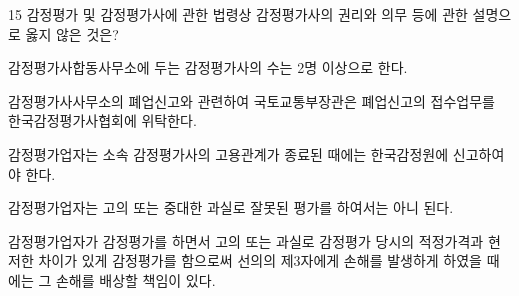\begin{question}{15}
감정평가 및 감정평가사에 관한 법령상 감정평가사의 권리와 의무 등에 관한 설명으로 옳지 않은 것은?
\begin{choices}
  \item 감정평가사합동사무소에 두는 감정평가사의 수는 2명 이상으로 한다.
  \item 감정평가사사무소의 폐업신고와 관련하여 국토교통부장관은 폐업신고의 접수업무를 한국감정평가사협회에 위탁한다.
  \item 감정평가업자는 소속 감정평가사의 고용관계가 종료된 때에는 한국감정원에 신고하여야 한다.
  \item 감정평가업자는 고의 또는 중대한 과실로 잘못된 평가를 하여서는 아니 된다.
  \item 감정평가업자가 감정평가를 하면서 고의 또는 과실로 감정평가 당시의 적정가격과 현저한 차이가 있게 감정평가를 함으로써 선의의 제3자에게 손해를 발생하게 하였을 때에는 그 손해를 배상할 책임이 있다.
\end{choices}
\end{question}
